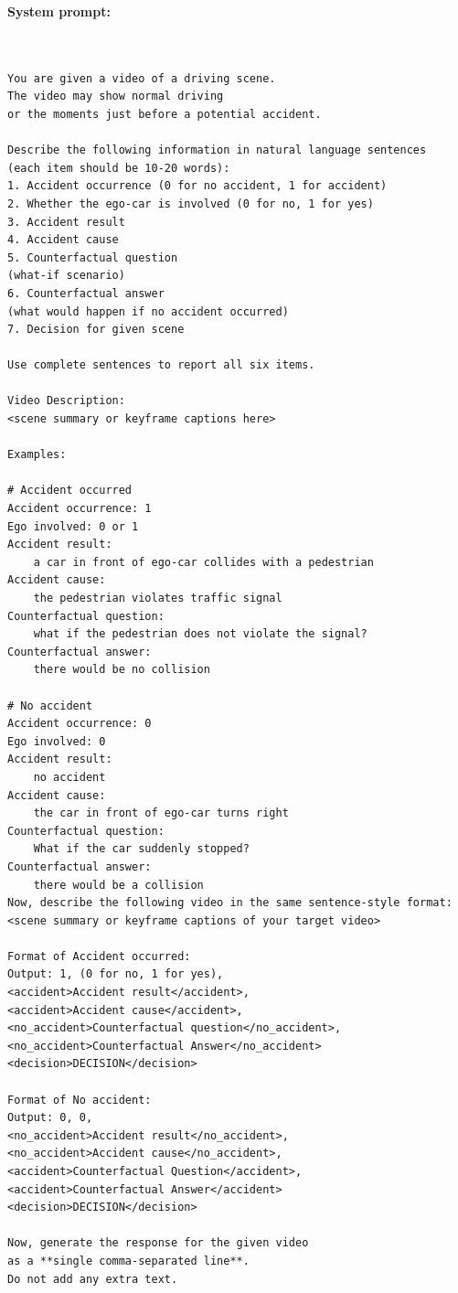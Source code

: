 \documentclass{article}
\begin{document}
\begin{tcolorbox}[title=Fine-Tuning and Test-Time Prompts for model w/ CF reasoning, breakable]
\small
\textbf{System prompt:}
\begin{verbatim}


You are given a video of a driving scene. 
The video may show normal driving 
or the moments just before a potential accident. 

Describe the following information in natural language sentences 
(each item should be 10-20 words):
1. Accident occurrence (0 for no accident, 1 for accident)
2. Whether the ego-car is involved (0 for no, 1 for yes)
3. Accident result
4. Accident cause
5. Counterfactual question 
(what-if scenario)
6. Counterfactual answer 
(what would happen if no accident occurred)
7. Decision for given scene

Use complete sentences to report all six items.

Video Description:
<scene summary or keyframe captions here>

Examples:

# Accident occurred
Accident occurrence: 1
Ego involved: 0 or 1
Accident result: 
    a car in front of ego-car collides with a pedestrian
Accident cause: 
    the pedestrian violates traffic signal
Counterfactual question: 
    what if the pedestrian does not violate the signal?
Counterfactual answer: 
    there would be no collision

# No accident
Accident occurrence: 0
Ego involved: 0
Accident result: 
    no accident
Accident cause: 
    the car in front of ego-car turns right
Counterfactual question: 
    What if the car suddenly stopped?
Counterfactual answer: 
    there would be a collision
Now, describe the following video in the same sentence-style format:
<scene summary or keyframe captions of your target video>

Format of Accident occurred:
Output: 1, (0 for no, 1 for yes), 
<accident>Accident result</accident>, 
<accident>Accident cause</accident>, 
<no_accident>Counterfactual question</no_accident>, 
<no_accident>Counterfactual Answer</no_accident>
<decision>DECISION</decision>

Format of No accident:
Output: 0, 0, 
<no_accident>Accident result</no_accident>, 
<no_accident>Accident cause</no_accident>, 
<accident>Counterfactual Question</accident>, 
<accident>Counterfactual Answer</accident>
<decision>DECISION</decision>

Now, generate the response for the given video 
as a **single comma-separated line**. 
Do not add any extra text.
\end{verbatim}
\end{tcolorbox}
\end{document}
